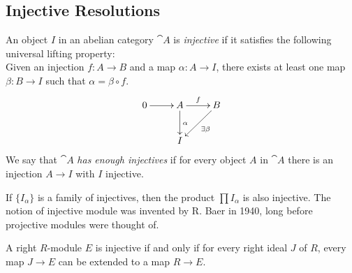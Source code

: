 \subsection{Injective Resolutions}

\begin{definition}
	An object $I$ in an abelian category $\cat{A}$ is \textit{injective} if it satisfies the following universal lifting property: \\
	Given an injection $f: A \rightarrow B$ and a map $\alpha:A\rightarrow I$, there exists at least one map $\beta:B\rightarrow I$ such that $\alpha=\beta\circ f$.
	\begin{align*}
		\xymatrix{
			0 \ar[r] &A \ar[r]^f \ar[d]^\alpha & B \ar[ld]^{\exists\beta} \\
			&I
		}
	\end{align*}
	We say that $\cat{A}$ \textit{has enough injectives} if for every object $A$ in $\cat{A}$ there is an injection $A\rightarrow I$ with $I$ injective. 
\end{definition}

\begin{note}
	If $\{I_\alpha\}$ is a family of injectives, then the product $\prod I_\alpha$ is also injective.
	The notion of injective module was invented by R. Baer in 1940, long before projective modules were thought of.
\end{note}

\begin{criterion}[Baer] \label{baer}
	A right $R$-module $E$ is injective if and only if for every right ideal $J$ of $R$, every map $J\rightarrow E$ can be extended to a map $R\rightarrow E$.
\end{criterion}

